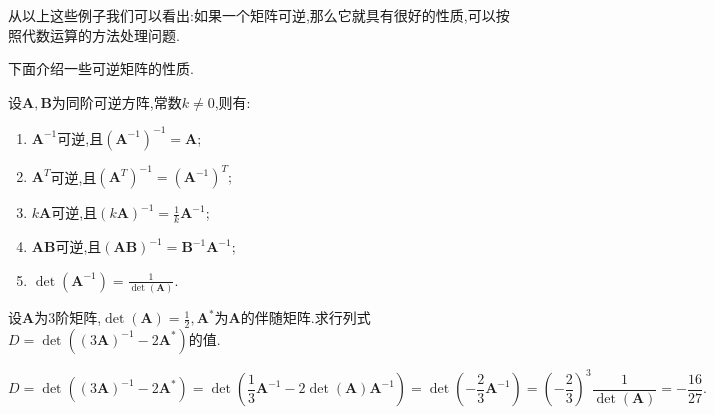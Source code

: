 从以上这些例子我们可以看出:如果一个矩阵可逆,那么它就具有很好的性质,可以按照代数运算的方法处理问题.

下面介绍一些可逆矩阵的性质.

设$\mathbf{A},\mathbf{B}$为同阶可逆方阵,常数$k\ne0$,则有:
\begin{enumerate}
	\item $\mathbf{A}^{-1}$可逆,且$(\mathbf{A}^{-1})^{-1}=\mathbf{A}$;
	\item $\mathbf{A}^T$可逆,且$(\mathbf{A}^T)^{-1}=(\mathbf{A}^{-1})^{T};$
	\item $k\mathbf{A}$可逆,且$(k\mathbf{A})^{-1}=\frac{1}{k}\mathbf{A}^{-1}$;
	\item $\mathbf{AB}$可逆,且$(\mathbf{AB})^{-1}=\mathbf{B}^{-1}\mathbf{A}^{-1}$;
	\item $\det(\mathbf{A}^{-1})=\frac{1}{\det(\mathbf{A})}.$
\end{enumerate}

\begin{example}
	设$\mathbf{A}$为$3$阶矩阵,$\det(\mathbf{A})=\frac{1}{2},\mathbf{A}^{\ast}$为$\mathbf{A}$的伴随矩阵.求行列式$D=\det((3\mathbf{A})^{-1}-2\mathbf{A}^{\ast})$的值.
\end{example}
\begin{solution}
	\[
		D=\det((3\mathbf{A})^{-1}-2\mathbf{A}^{\ast})=\det(\frac{1}{3}\mathbf{A}^{-1}-2\det(\mathbf{A})\mathbf{A}^{-1})=\det(-\frac{2}{3}\mathbf{A}^{-1})=(-\frac{2}{3})^3\frac{1}{\det(\mathbf{A})}=-\frac{16}{27}.
	\]
\end{solution}